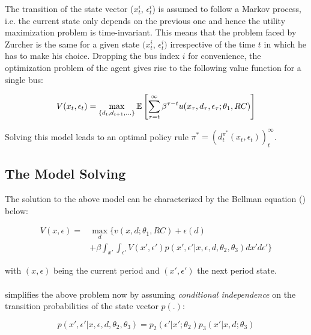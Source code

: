 The transition of the state vector ($x^i_t$, $\epsilon^i_t$) is assumed to follow a Markov process, i.e. the current state only depends on the previous one and hence the utility maximization problem is time-invariant. This means that the problem faced by Zurcher is the same for a given state $(x^i_t$, $\epsilon^i_t)$ irrespective of the time $t$ in which he has to make his choice. Dropping the bus index $i$ for convenience, the optimization problem of the agent gives rise to the following value function for a single bus:

\begin{equation}
V(x_t, \epsilon_t) = \max_{\{d_t, d_{t+1}, ... \}} \operatorname*{\mathbb{E}} \left[\sum_{\tau=t}^{\infty} \beta^{\tau - t} u(x_\tau, d_\tau, \epsilon_\tau; \theta_1, RC)\right]
\end{equation}

Solving this model leads to an optimal policy rule $\pi^* = (d^{\pi^*}_t(x_t, \epsilon_t))^\infty_t$.

\subsection{The Model Solving}

The solution to the above model can be characterized by the Bellman equation (\cite{Bellman.1954}) below:

\begin{equation}
	\begin{split}
		V(x, \epsilon) = &\max_{d} \{v(x, d; \theta_1, RC) + \epsilon(d) \\[+3mm]
		&+ \beta \int_{x'} \int_{\epsilon'} V(x', \epsilon') p(x', \epsilon'| x, \epsilon, d, \theta_2, \theta_3) dx' d\epsilon'\}
	\end{split}
\end{equation}

with $(x, \epsilon)$ being the current period and $(x', \epsilon')$ the next period state. \paragraph{}

\cite{Rust.1987} simplifies the above problem now by assuming \textit{conditional independence} on the transition probabilities of the state vector $p(.)$:

\begin{equation}
	p(x', \epsilon'| x, \epsilon, d, \theta_2, \theta_3) = p_2(\epsilon'|x';\theta_2)p_3(x'|x, d; \theta_3)
\end{equation}

